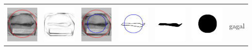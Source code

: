 \begin{table}[H]
\begin{tabular}{|m{0.7in}|m{0.7in}|m{0.7in}|m{0.7in}|m{0.7in}|m{0.7in}|m{0.7in}|}
		&  &  & & & &  \\
		\includegraphics[width=0.7in]{dataset/dataset_3/luka_merah/ready/35_integer_init.jpg}&
		\includegraphics[width=0.7in]{dataset/dataset_3/luka_merah/ready/35_integer_ext.jpg}&
		\includegraphics[width=0.7in]{dataset/dataset_3/luka_merah/ready/35_integer_result.jpg}&
		\includegraphics[width=0.7in]{dataset/dataset_3/luka_merah/ready/35_gt_r_integer.jpg}&
		\includegraphics[width=0.7in]{dataset/dataset_3/luka_merah/ready/35_r.jpg}&
		\includegraphics[width=0.7in]{dataset/dataset_3/luka_merah/ready/35_integer_r.jpg}&
		gagal\\
		\hline
		

\end{tabular}
\end{table}
